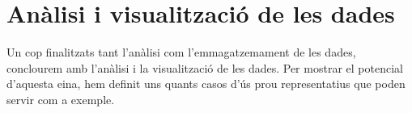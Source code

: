 \chapter{Anàlisi i visualització de les dades}\label{ch:log-analysis}

Un cop finalitzats tant l’anàlisi com l’emmagatzemament de les dades, conclourem amb l’anàlisi i la visualització de les dades.
Per mostrar el potencial d’aquesta eina, hem definit uns quants casos d’ús prou representatius que poden servir com a exemple.

\noindent \\

\clearpage
